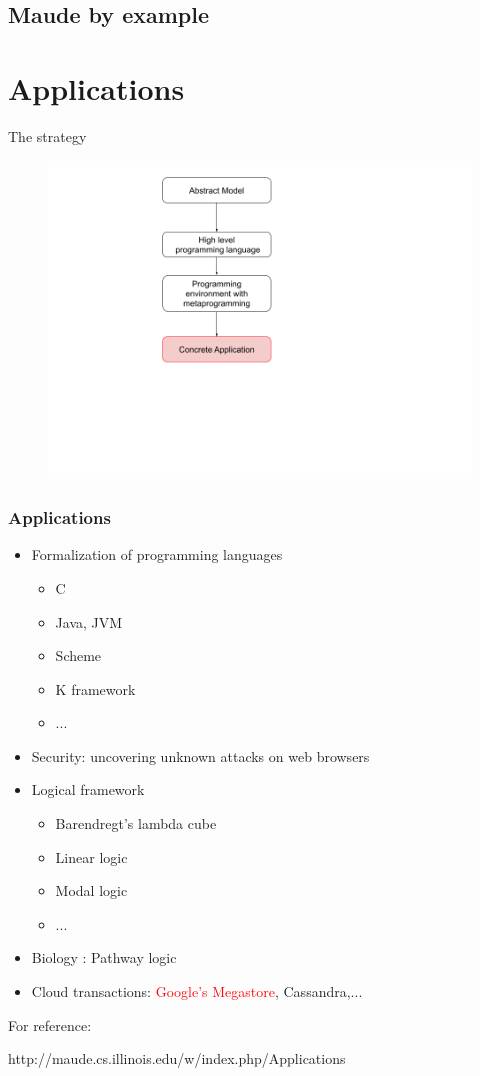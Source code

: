 \documentclass{beamer}
\begin{document}
\subsection{Maude by example}
\section{Applications}
\begin{frame}{The strategy}
    \begin{figure}
        \includegraphics[height=\textheight]{img/sec4.png}
    \end{figure}
\end{frame}
\begin{frame}
    \frametitle{Applications}
    \begin{itemize}
        \item Formalization of programming languages 
        \begin{itemize}
            \item C
            \item Java, JVM
            \item Scheme
            \item K framework
            \item ...
        \end{itemize}
        \item Security: uncovering unknown attacks on web browsers 
        \item Logical framework 
        \begin{itemize}
            \item Barendregt's lambda cube 
            \item Linear logic 
            \item Modal logic
            \item ...
        \end{itemize}
        \item Biology : Pathway logic 
        \item Cloud transactions: \textcolor{red}{Google's Megastore}, Cassandra,...
    \end{itemize}

    For reference:

    http://maude.cs.illinois.edu/w/index.php/Applications
\end{frame}
\end{document}
